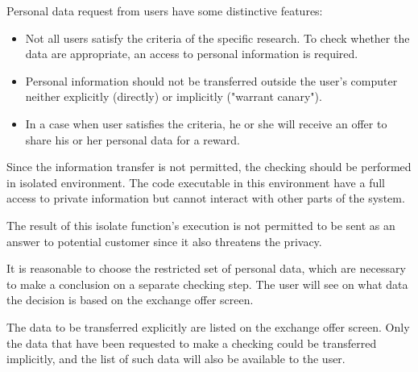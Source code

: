 Personal data request from users have some distinctive features:
\begin{itemize}
\item Not all users satisfy the criteria of the specific research. To check whether the data are appropriate, an access to personal information is required.
\item Personal information should not be transferred outside the user’s computer neither explicitly (directly) or implicitly ("warrant canary").
\item In a case when user satisfies the criteria, he or she will receive an offer to share his or her personal data for a reward.
\end{itemize}

\begin{note}[CONCL. 1]
  Since the information transfer is not permitted, the checking should be performed in isolated environment.
  The code executable in this environment have a full access to private information but cannot interact with other parts of the system.
\end{note}

\begin{note}[CONCL. 2]
  The result of this isolate function’s execution is not permitted to be sent as an answer to potential customer since it also threatens the privacy.
\end{note}

\begin{note}[CONCL. 3]
  It is reasonable to choose the restricted set of personal data, which are necessary to make a conclusion on a separate checking step. The user will see on what data the decision is based on the exchange offer screen.
\end{note}

\begin{note}[CONCL. 4]
  The data to be transferred explicitly are listed on the exchange offer screen. Only the data that have been requested to make a checking could be transferred implicitly, and the list of such data will also be available to the user.
\end{note}


